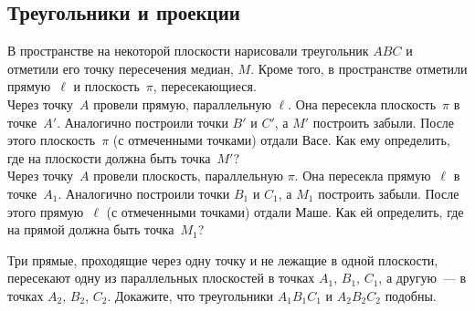 \subsection*{Треугольники и проекции}

\begin{problems}

\item
В пространстве на некоторой плоскости нарисовали треугольник $ABC$ и отметили
его точку пересечения медиан, $M$.
Кроме того, в пространстве отметили прямую~$\ell$ и плоскость~$\pi$,
пересекающиеся.
\\
\subproblem
Через точку~$A$ провели прямую, параллельную $\ell$.
Она пересекла плоскость~$\pi$ в точке~$A'$.
Аналогично построили точки $B'$ и $C'$, а $M'$ построить забыли.
После этого плоскость~$\pi$ (с отмеченными точками) отдали Васе.
Как ему определить, где на плоскости должна быть точка~$M'$?
\\
\subproblem
Через точку~$A$ провели плоскость, параллельную $\pi$.
Она пересекла прямую~$\ell$ в точке~$A_1$.
Аналогично построили точки $B_1$ и $C_1$, а $M_1$ построить забыли.
После этого прямую~$\ell$ (с отмеченными точками) отдали Маше.
Как ей определить, где на прямой должна быть точка~$M_1$?

\item
Три прямые, проходящие через одну точку и не лежащие в одной плоскости,
пересекают одну из параллельных плоскостей в точках $A_1$, $B_1$, $C_1$,
а другую~--- в точках $A_2$, $B_2$, $C_2$.
Докажите, что треугольники $A_1 B_1 C_1$ и $A_2 B_2 C_2$ подобны.

\end{problems}

